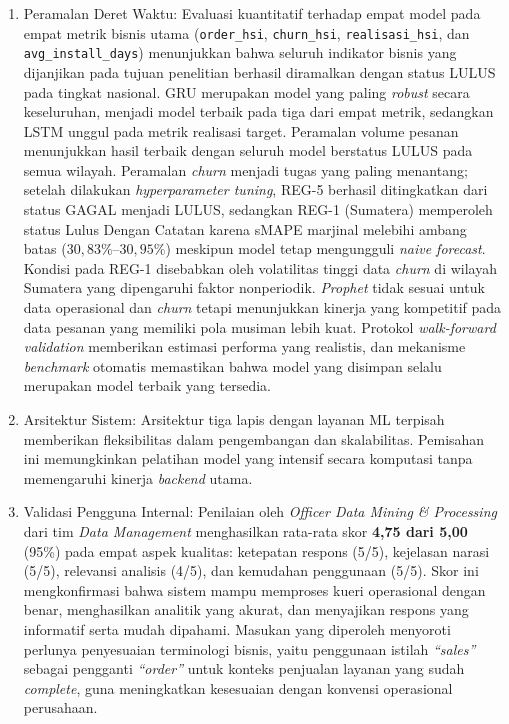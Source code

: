 \begin{enumerate}
    \item Peramalan Deret Waktu: Evaluasi kuantitatif terhadap empat model pada empat metrik bisnis utama (\texttt{order\_}\allowbreak\texttt{hsi}, \allowbreak\texttt{churn\_}\allowbreak\texttt{hsi}, \allowbreak\texttt{realisasi\_}\allowbreak\texttt{hsi}, \allowbreak dan 
    \texttt{avg\_}\allowbreak\texttt{install\_}\allowbreak\texttt{days}) menunjukkan bahwa seluruh indikator bisnis yang dijanjikan pada tujuan penelitian berhasil diramalkan dengan status LULUS pada tingkat nasional. GRU merupakan model yang paling \textit{robust} secara keseluruhan, menjadi model terbaik pada tiga dari empat metrik, sedangkan LSTM unggul pada metrik realisasi target. Peramalan volume pesanan menunjukkan hasil terbaik dengan seluruh model berstatus LULUS pada semua wilayah. Peramalan \textit{churn} menjadi tugas yang paling menantang; setelah dilakukan \textit{hyperparameter tuning}, REG-5 berhasil ditingkatkan dari status GAGAL menjadi LULUS, sedangkan REG-1 (Sumatera) memperoleh status Lulus Dengan Catatan karena sMAPE marjinal melebihi ambang batas ($30{,}83\%$--$30{,}95\%$) meskipun model tetap mengungguli \textit{naive forecast}. Kondisi pada REG-1 disebabkan oleh volatilitas tinggi data \textit{churn} di wilayah Sumatera yang dipengaruhi faktor nonperiodik. \textit{Prophet} tidak sesuai untuk data operasional dan \textit{churn} tetapi menunjukkan kinerja yang kompetitif pada data pesanan yang memiliki pola musiman lebih kuat. Protokol \textit{walk-forward va\-li\-da\-tion} memberikan estimasi performa yang realistis, dan mekanisme \textit{benchmark} otomatis memastikan bahwa model yang disimpan selalu merupakan model terbaik yang tersedia.

    \item Arsitektur Sistem: Arsitektur tiga lapis dengan layanan ML terpisah memberikan fleksibilitas dalam pengembangan dan skalabilitas. Pemisahan ini memungkinkan pelatihan model yang intensif secara komputasi tanpa memengaruhi kinerja \textit{backend} utama.

    \item Validasi Pengguna Internal: Penilaian oleh \textit{Officer Data Mining \& Processing} dari tim \textit{Data Management} menghasilkan rata-rata skor \textbf{4{,}75 dari 5{,}00} (95\%) pada empat aspek kualitas: ketepatan respons (5/5), kejelasan narasi (5/5), relevansi analisis (4/5), dan kemudahan penggunaan (5/5). Skor ini mengkonfirmasi bahwa sistem mampu memproses kueri operasional dengan benar, menghasilkan analitik yang akurat, dan menyajikan respons yang informatif serta mudah dipahami. Masukan yang diperoleh menyoroti perlunya penyesuaian terminologi bisnis, yaitu penggunaan istilah \textit{``sales''} sebagai pengganti \textit{``order''} untuk konteks penjualan layanan yang sudah \textit{complete}, guna meningkatkan kesesuaian dengan konvensi operasional perusahaan.
\end{enumerate}

